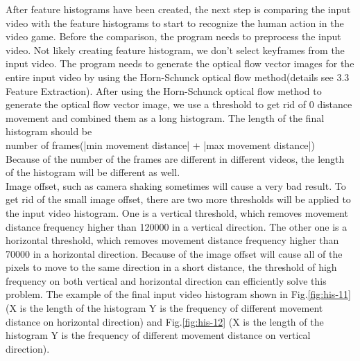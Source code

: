 \documentclass[runningheads,a4paper]{llncs}
\begin{document}
		After feature histograms have been created, the next step is comparing the input video with the feature histograms to start to recognize the human action in the video game. Before the comparison, the program needs to preprocess the input video. Not likely creating feature histogram, we don’t select keyframes from the input video. The program needs to generate the optical flow vector images for the entire input video by using the Horn-Schunck optical flow method(details see 3.3 Feature Extraction). After using the Horn-Schunck optical flow method to generate the optical flow vector image, we use a threshold to get rid of 0 distance movement and combined them as a long histogram. The length of the final histogram  should be\\
		number of frames(|min movement distance| + |max movement distance|) \\
		Because of the number of the frames are different in different videos, the length of the histogram will be different as well.\\
		Image offset, such as camera shaking sometimes will cause a very bad result. To get rid of the small image offset, there are two more thresholds will be applied to the input video histogram. One is a vertical threshold, which removes movement distance frequency higher than 120000 in a vertical direction.  The other one is a horizontal threshold, which removes movement distance frequency higher than 70000 in a horizontal direction. Because of the image offset will cause all of the pixels to move to the same direction in a short distance, the threshold of high frequency on both vertical and horizontal direction can efficiently solve this problem. The example of the final input video histogram shown in Fig.\ref{fig:his-11} (X is the length of the histogram Y is the frequency of different movement distance on horizontal direction) and Fig.\ref{fig:his-12} (X is the length of the histogram Y is the frequency of different movement distance on vertical direction).
\end{document}
